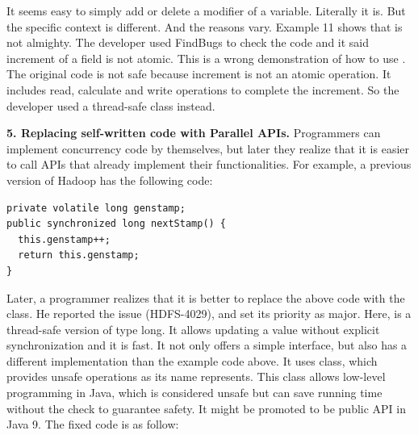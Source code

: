 It seems easy to simply add or delete a  modifier of a variable. Literally it is. But the specific context is different. And the reasons vary. Example 11 shows that  is not almighty. The developer used FindBugs to check the code and it said increment of a  field is not atomic. This is a wrong demonstration of how to use . The original code is not safe because increment is not an atomic operation. It includes read, calculate and write operations to complete the increment. So the developer used a thread-safe class instead.

\noindent
\textbf{5. Replacing self-written code with Parallel APIs.} Programmers can implement concurrency code by themselves, but later they realize that it is easier to call APIs that already implement their functionalities. For example, a previous version of Hadoop has the following code:%

%

\begin{lstlisting}
private volatile long genstamp;
public synchronized long nextStamp() {
  this.genstamp++;
  return this.genstamp;
}
\end{lstlisting}

Later, a programmer realizes that it is better to replace the above code with the  class. He reported the issue (HDFS-4029), and set its priority as major. Here,  is a thread-safe version of type long. It allows updating a  value without explicit synchronization and it is fast. It not only offers a simple interface, but also has a different implementation than the example code above. It uses  class, which provides unsafe operations as its name represents. This class allows low-level programming in Java, which is considered unsafe but can save running time without the check to guarantee safety. It might be promoted to be public API in Java 9. The fixed code is as follow:

